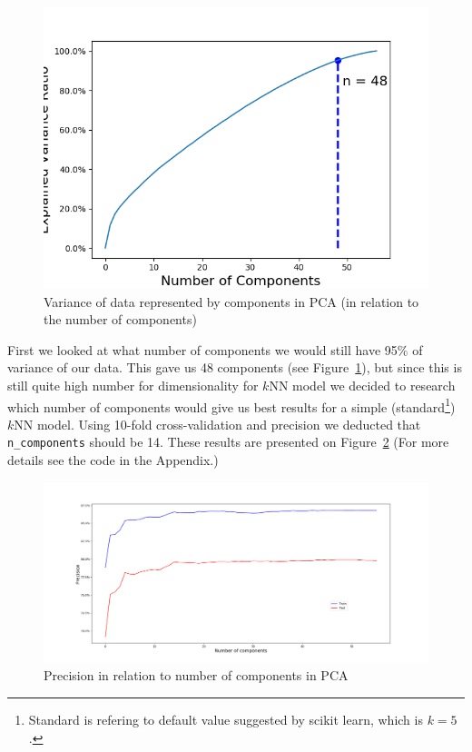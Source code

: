 \documentclass[11pt,a4paper]{article}
\begin{document}
\begin{figure}[ht!]
\begin{center}
\includegraphics[scale=0.60]{n_components.png}
\caption{Variance of data represented by components in PCA (in relation to the number of components)}
\label{fig:n-components}
\end{center}
\end{figure}
First we looked at what number of components we would still have 95$\%$ of variance of our data. This gave us 48 components (see Figure~\ref{fig:n-components}), but since this is still quite high number for dimensionality for $k$NN model we decided to research which number of components would give us best results for a simple (standard\footnote{Standard is refering to default value suggested by scikit learn, which is $k=5$.}) $k$NN model. Using 10-fold cross-validation and precision we deducted that {\tt n\_components} should be 14. These results are presented on Figure~\ref{fig:hypertune_n_components} (For more details see the code in the Appendix.)
\begin{figure}[ht!]
\begin{center}
\hspace*{-17mm}
\includegraphics[scale=0.40]{hypertune_n_components_recall.png}
\caption{Precision in relation to number of components in PCA}
\label{fig:hypertune_n_components}
\end{center}
\end{figure}
\end{document}
